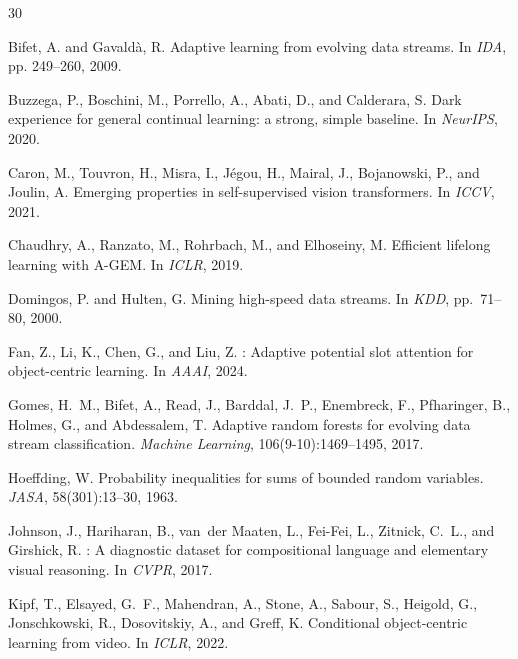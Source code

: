 \documentclass{article}
\begin{document}
\begin{thebibliography}{30}

Bifet, A. and Gavald\`a, R.
\newblock Adaptive learning from evolving data streams.
\newblock In \emph{IDA}, pp. 249--260, 2009.

Buzzega, P., Boschini, M., Porrello, A., Abati, D., and Calderara, S.
\newblock Dark experience for general continual learning: a strong, simple baseline.
\newblock In \emph{NeurIPS}, 2020.

Caron, M., Touvron, H., Misra, I., J\'egou, H., Mairal, J., Bojanowski, P., and Joulin, A.
\newblock Emerging properties in self-supervised vision transformers.
\newblock In \emph{ICCV}, 2021.

Chaudhry, A., Ranzato, M., Rohrbach, M., and Elhoseiny, M.
\newblock Efficient lifelong learning with {A-GEM}.
\newblock In \emph{ICLR}, 2019.

Domingos, P. and Hulten, G.
\newblock Mining high-speed data streams.
\newblock In \emph{KDD}, pp.~71--80, 2000.

Fan, Z., Li, K., Chen, G., and Liu, Z.
: Adaptive potential slot attention for object-centric learning.
\newblock In \emph{AAAI}, 2024.

Gomes, H.~M., Bifet, A., Read, J., Barddal, J.~P., Enembreck, F., Pfharinger, B., Holmes, G., and Abdessalem, T.
\newblock Adaptive random forests for evolving data stream classification.
\newblock \emph{Machine Learning}, 106(9-10):1469--1495, 2017.

Hoeffding, W.
\newblock Probability inequalities for sums of bounded random variables.
\newblock \emph{JASA}, 58(301):13--30, 1963.

Johnson, J., Hariharan, B., van~der Maaten, L., Fei-Fei, L., Zitnick, C.~L., and Girshick, R.
: A diagnostic dataset for compositional language and elementary visual reasoning.
\newblock In \emph{CVPR}, 2017.

Kipf, T., Elsayed, G.~F., Mahendran, A., Stone, A., Sabour, S., Heigold, G., Jonschkowski, R., Dosovitskiy, A., and Greff, K.
\newblock Conditional object-centric learning from video.
\newblock In \emph{ICLR}, 2022.


\end{thebibliography}
\end{document}
